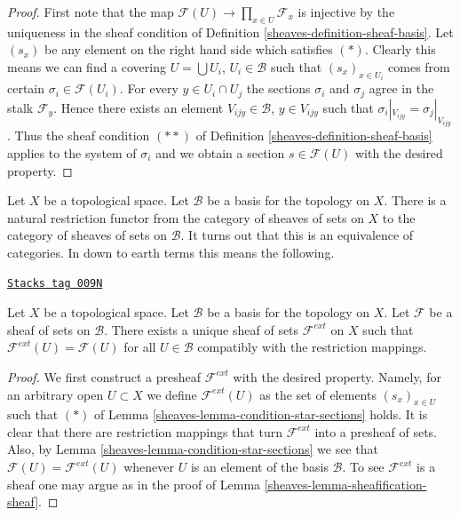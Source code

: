 \begin{proof}

First note that the map
$\mathcal{F}(U) \to \prod\nolimits_{x \in U} \mathcal{F}_x$
is injective by the uniqueness in the sheaf condition
of Definition \ref{sheaves-definition-sheaf-basis}. Let $(s_x)$ be
any element on the right hand side which satisfies $(*)$.
Clearly this means we can find a covering $U = \bigcup U_i$,
$U_i \in \mathcal{B}$ such that $(s_x)_{x \in U_i}$ comes from
certain $\sigma_i \in \mathcal{F}(U_i)$. For every $y \in U_i \cap U_j$
the sections $\sigma_i$ and $\sigma_j$ agree in the stalk
$\mathcal{F}_y$. Hence there exists an element $V_{ijy} \in \mathcal{B}$,
$y \in V_{ijy}$ such that $\sigma_i|_{V_{ijy}} = \sigma_j|_{V_{ijy}}$.
Thus the sheaf condition $(**)$ of Definition \ref{sheaves-definition-sheaf-basis}
applies to the system of $\sigma_i$ and we obtain a section
$s \in \mathcal{F}(U)$ with the desired property.
\end{proof}

Let $X$ be a topological space.
Let $\mathcal{B}$ be a basis for the topology on $X$.
There is a natural restriction functor from the category
of sheaves of sets on $X$ to the category of sheaves of
sets on $\mathcal{B}$. It turns out that this is an equivalence
of categories. In down to earth terms this means the following.

\begin{lemma}
\label{sheaves-lemma-extend-off-basis}
\href{https://stacks.math.columbia.edu/tag/009N}{\texttt{Stacks tag 009N}}

Let $X$ be a topological space.
Let $\mathcal{B}$ be a basis for the topology on $X$.
Let $\mathcal{F}$ be a sheaf of sets on $\mathcal{B}$.
There exists a unique sheaf of sets $\mathcal{F}^{ext}$
on $X$ such that $\mathcal{F}^{ext}(U) = \mathcal{F}(U)$
for all $U \in \mathcal{B}$ compatibly with the restriction
mappings.
\end{lemma}

\begin{proof}

We first construct a presheaf $\mathcal{F}^{ext}$ with the
desired property. Namely, for an arbitrary open $U \subset X$ we
define $\mathcal{F}^{ext}(U)$ as the set of elements
$(s_x)_{x \in U}$ such that $(*)$ of
Lemma \ref{sheaves-lemma-condition-star-sections} holds.
It is clear that there are restriction mappings
that turn $\mathcal{F}^{ext}$ into a presheaf of sets.
Also, by Lemma \ref{sheaves-lemma-condition-star-sections} we
see that $\mathcal{F}(U) = \mathcal{F}^{ext}(U)$
whenever $U$ is an element of the basis $\mathcal{B}$.
To see $\mathcal{F}^{ext}$ is a sheaf one may
argue as in the proof of Lemma \ref{sheaves-lemma-sheafification-sheaf}.
\end{proof}

